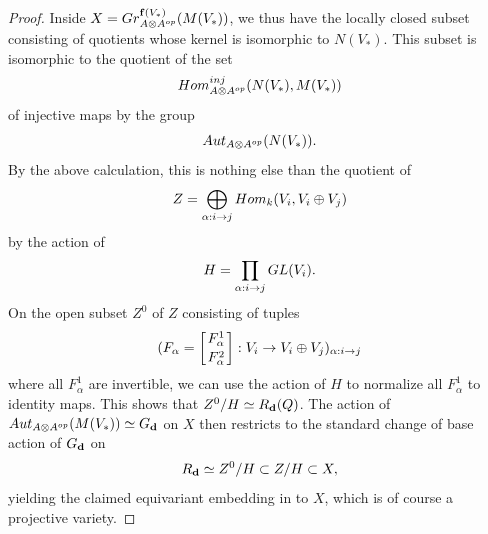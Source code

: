 \documentclass[10pt,a4paper]{amsart}
\begin{document}
\begin{proof}
Inside $X={\rm Gr}^{{\bf f}(V_*)}_{A\otimes A^{\rm op}}(M(V_*))$, we thus have the locally closed subset consisting of quotients whose kernel is isomorphic to $N(V_*)$. This subset is isomorphic to the quotient of the set
$${\rm Hom}^{\rm inj}_{A\otimes A^{\rm op}}(N(V_*),M(V_*))$$
of injective maps by the group
$${\rm Aut}_{A\otimes A^{\rm op}}(N(V_*)).$$
By the above calculation, this is nothing else than the quotient of
$$Z=\bigoplus_{\alpha:i\rightarrow j}{\rm Hom}_k(V_i, V_i\oplus V_j)$$
by the action of
$$H=\prod_{\alpha:i\rightarrow j}{\rm GL}(V_i).$$
On the open subset $Z^0$ of $Z$ consisting of tuples 
$$(F_\alpha=\left[F_\alpha^1\atop F_\alpha^2\right]:V_i\rightarrow V_i\oplus V_j)_{\alpha:i\rightarrow j}$$ 
where all $F^1_\alpha$ are invertible, we can use the action of $H$ to normalize all 
$F^1_\alpha$ to identity maps.  This shows that $Z^0/H\simeq R_{\bf d}(Q)$. 
The action of ${\rm Aut}_{A\otimes A^{\rm op}}(M(V_*))\simeq G_{\bf d}$ on $X$ 
then restricts to the standard change of base action of $G_{\bf d}$ on 
$$R_{\bf d}\simeq Z^0/H\subset Z/H\subset X,$$
yielding the claimed equivariant embedding in to $X$, which is of course a projective variety.
\end{proof}
\end{document}
